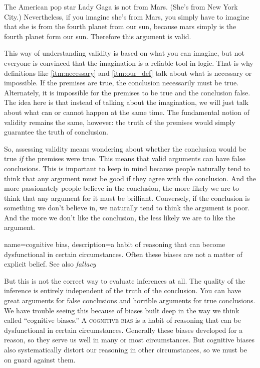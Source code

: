 The American pop star Lady Gaga is not from Mars. (She's from New York City.) Nevertheless, if you imagine she's from Mars, you simply have to imagine that she is from the fourth planet from our sun, because mars simply is the fourth planet form our sun. Therefore this argument is valid. 

This way of understanding validity is based on what you can imagine, but not everyone is convinced that the imagination is a reliable tool in logic. That is why definitions like \ref{itm:necessary} and \ref{itm:our_def} talk about what is necessary or impossible. If the premises are true, the conclusion necessarily must be true. Alternately, it is impossible for the premises to be true and the conclusion false. The idea here is that instead of talking about the imagination, we will just talk about what can or cannot happen at the same time. The fundamental notion of validity remains the same, however: the truth of the premises would simply guarantee the truth of conclusion. 

So, assessing validity means wondering about whether the conclusion would be true \textit{if} the premises were true. This means that valid arguments can have false conclusions. This is important to keep in mind because people naturally tend to think that any argument must be good if they agree with the conclusion. And the more passionately people believe in the conclusion, the more likely we are to think that any argument for it must be brilliant. Conversely, if the conclusion is something we don't believe in, we naturally tend to think the argument is poor. And the more we don't like the conclusion, the less likely we are to like the argument. 





{
name=cognitive bias,
description={a habit of reasoning that can become dysfunctional in certain circumstances. Often these biases are not a matter of explicit belief. See also \emph{fallacy}}
}

But this is not the correct way to evaluate inferences at all. The quality of the inference is entirely independent of the truth of the conclusion. You can have great arguments for false conclusions and horrible arguments for true conclusions. We have trouble seeing this because of biases built deep in the way we think called ``cognitive biases.'' A  \textsc{\gls{cognitive bias}}\label{def:cognitive_bias} is a habit of reasoning that can be dysfunctional in certain circumstances. Generally these biases developed for a reason, so they serve us well in many or most circumstances. But cognitive biases also systematically distort our reasoning in other circumstances, so we must be on guard against them.

